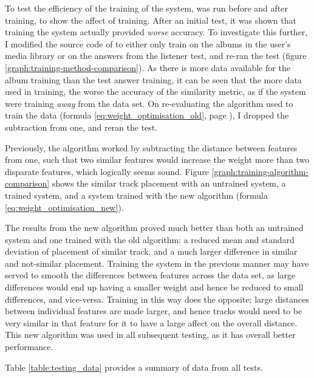 To test the efficiency of the training of the system,  was run before and after training, to show the affect of training. After an initial test, it was shown that training the system actually provided \emph{worse} accuracy.  To investigate this further, I modified the source code of  to either only train on the albums in the user's media library or on the answers from the listener test, and re-ran the test (figure \ref{graph:training-method-comparison}). As there is more data available for the album training than the test answer training, it can be seen that the more data used in training, the worse the accuracy of the similarity metric, as if the system were training \emph{away} from the data set. On re-evaluating the algorithm used to train the data (formula \ref{eq:weight_optimisation_old}, page \pageref{eq:weight_optimisation_old}), I dropped the subtraction from one, and reran the test. 

Previously, the algorithm worked by subtracting the distance between features from one, such that two similar features would increase the weight more than two disparate features, which logically seems sound. Figure \ref{graph:training-algorithm-comparison} shows the similar track placement with an untrained system, a trained system, and a system trained with the new algorithm (formula \ref{eq:weight_optimisation_new}).


The results from the new algorithm proved much better than both an untrained system and one trained with the old algorithm: a reduced mean and standard deviation of placement of similar track, and a much larger difference in similar and not-similar placement. Training the system in the previous manner may have served to smooth the differences between features across the data set, as large differences would end up having a smaller weight and hence be reduced to small differences, and vice-versa. Training in this way does the opposite; large distances between individual features are made larger, and hence tracks would need to be very similar in that feature for it to have a large affect on the overall distance. This new algorithm was used in all subsequent testing, as it has overall better performance.

Table \ref{table:testing_data} provides a summary of data from all tests.

\pagebreak
